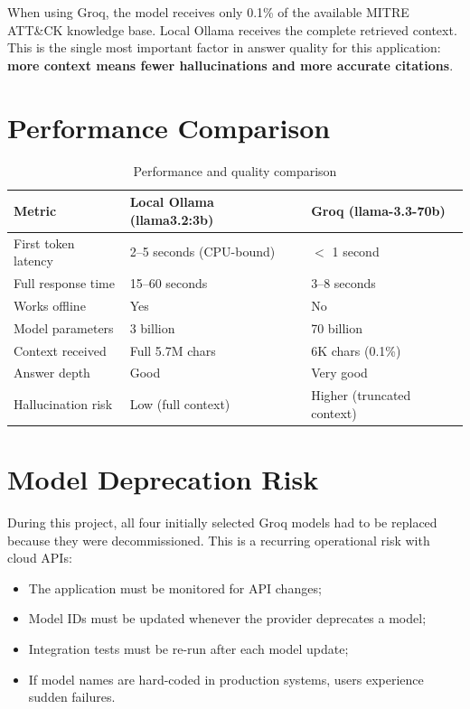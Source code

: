 \documentclass[12pt,a4paper]{report}
\newcommand{\ATTACK}{MITRE ATT\&CK}
\begin{document}
When using Groq, the model receives only 0.1\% of the available \ATTACK{} knowledge base. Local Ollama receives the complete retrieved context. This is the single most important factor in answer quality for this application: \textbf{more context means fewer hallucinations and more accurate citations}.

\section{Performance Comparison}

\begin{table}[H]
\centering
\begin{tabularx}{\textwidth}{lXX}
\toprule
\textbf{Metric} & \textbf{Local Ollama (llama3.2:3b)} & \textbf{Groq (llama-3.3-70b)} \\
\midrule
First token latency & 2--5 seconds (CPU-bound) & $<$ 1 second \\
Full response time & 15--60 seconds & 3--8 seconds \\
Works offline & Yes & No \\
Model parameters & 3 billion & 70 billion \\
Context received & Full 5.7M chars & 6K chars (0.1\%) \\
Answer depth & Good & Very good \\
Hallucination risk & Low (full context) & Higher (truncated context) \\
\bottomrule
\end{tabularx}
\caption{Performance and quality comparison}
\label{tab:perf_compare}
\end{table}

\section{Model Deprecation Risk}

During this project, all four initially selected Groq models had to be replaced because they were decommissioned. This is a recurring operational risk with cloud APIs:

\begin{itemize}
    \item The application must be monitored for API changes;
    \item Model IDs must be updated whenever the provider deprecates a model;
    \item Integration tests must be re-run after each model update;
    \item If model names are hard-coded in production systems, users experience sudden failures.
\end{itemize}
\end{document}
